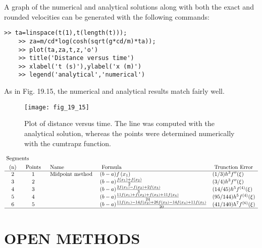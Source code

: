 \documentclass[../main.tex]{subfiles}
\begin{document}
	A graph of the numerical and analytical solutions along with both the exact and rounded
velocities can be generated with the following commands:

\begin{lstlisting}[numbers=none]
	>> ta=linspace(t(1),t(length(t)));
	>> za=m/cd*log(cosh(sqrt(g*cd/m)*ta));
	>> plot(ta,za,t,z,'o')
	>> title('Distance versus time')
	>> xlabel('t (s)'),ylabel('x (m)')
	>> legend('analytical','numerical')
\end{lstlisting}
As in Fig. 19.15, the numerical and analytical results match fairly well. 

\begin{figure}[H]
    \centering
    \texttt{[image: fig\_19\_15]}
   \caption{\textsf{Plot of distance versus time. The line was computed with the analytical solution, whereas the
   points were determined numerically with the cumtrapz function.}}\label{fig:fig_19_15}
\end{figure}

$$
\begin{aligned}
&\text { Segments }\\
&\begin{array}{cclll}
\text { (n) } & \text { Points } & \text { Name } & \text { Formula } & \text { Trunction Error } \\
\hline 2 & 1 & \text { Midpoint method } &(b-a) f\left(x_{1}\right) & (1 / 3) h^{3} f^{\prime \prime}(\xi)\\
3 & 2 & &(b-a) \frac{f\left(x_{1}\right)+f\left(x_{2}\right)}{2} & (3 / 4) h^{3} f^{\prime \prime}(\xi)\\
4 & 3 & &(b-a) \frac{2 f\left(x_{1}\right)-f\left(x_{2}\right)+2 f\left(x_{3}\right)}{3} & (14 / 45) h^{5} f^{(4)}(\xi) \\
5 & 4 & &(b-a) \frac{11 f\left(x_{1}\right)+f\left(x_{2}\right)+f\left(x_{3}\right)+11 f\left(x_{4}\right)}{24} & (95 / 144) h^{5} f^{(4)}(\xi)\\
6 & 5 & &(b-a) \frac{11 f\left(x_{1}\right)-14 f\left(x_{2}\right)+26 f\left(x_{3}\right)-14 f\left(x_{4}\right)+11 f\left(x_{5}\right)}{20} & (41 / 140) h^{7} f^{(6)}(\xi)\\
\hline
\end{array}
\end{aligned}
$$

\section{OPEN METHODS}
\end{document}
